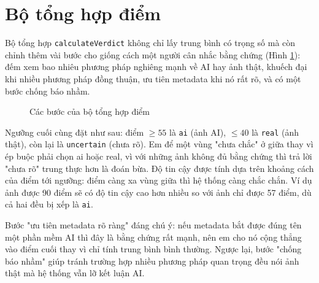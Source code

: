 \documentclass[14pt,a4paper,oneside]{report}
\begin{document}
\section{Bộ tổng hợp điểm}
Bộ tổng hợp \texttt{calculateVerdict} không chỉ lấy trung bình có trọng số mà còn chỉnh thêm vài bước cho giống cách một người cân nhắc bằng chứng (Hình \ref{fig:verdict-flow}): đếm xem bao nhiêu phương pháp nghiêng mạnh về AI hay ảnh thật, khuếch đại khi nhiều phương pháp đồng thuận, ưu tiên metadata khi nó rất rõ, và có một bước chống báo nhầm.

\begin{figure}[H]
\centering
{}
\caption{Các bước của bộ tổng hợp điểm}
\label{fig:verdict-flow}
\end{figure}

Ngưỡng cuối cùng đặt như sau: điểm $\geq 55$ là \texttt{ai} (ảnh AI), $\leq 40$ là \texttt{real} (ảnh thật), còn lại là \texttt{uncertain} (chưa rõ). Em để một vùng "chưa chắc" ở giữa thay vì ép buộc phải chọn ai hoặc real, vì với những ảnh không đủ bằng chứng thì trả lời "chưa rõ" trung thực hơn là đoán bừa. Độ tin cậy được tính dựa trên khoảng cách của điểm tới ngưỡng: điểm càng xa vùng giữa thì hệ thống càng chắc chắn. Ví dụ ảnh được 90 điểm sẽ có độ tin cậy cao hơn nhiều so với ảnh chỉ được 57 điểm, dù cả hai đều bị xếp là \texttt{ai}.

Bước "ưu tiên metadata rõ ràng" đáng chú ý: nếu metadata bắt được đúng tên một phần mềm AI thì đây là bằng chứng rất mạnh, nên em cho nó cộng thẳng vào điểm cuối thay vì chỉ tính trung bình bình thường. Ngược lại, bước "chống báo nhầm" giúp tránh trường hợp nhiều phương pháp quan trọng đều nói ảnh thật mà hệ thống vẫn lỡ kết luận AI.

\clearpage
\end{document}
